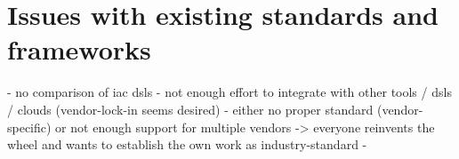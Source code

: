 \section{Issues with existing standards and frameworks}
- no comparison of iac dsls
- not enough effort to integrate with other tools / dsls / clouds (vendor-lock-in seems desired)
- either no proper standard (vendor-specific) or not enough support for multiple vendors -> everyone reinvents the wheel and wants to establish the own work as industry-standard
- %

